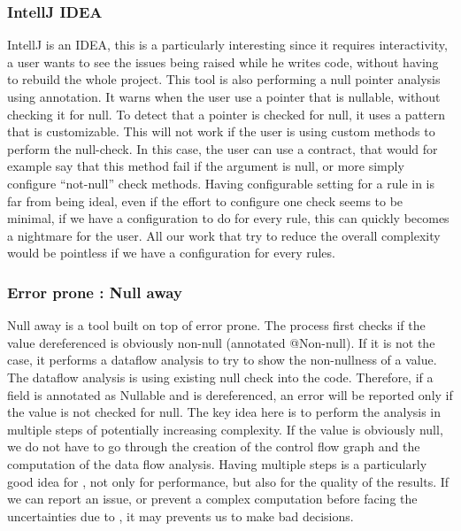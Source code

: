 \subsubsection{IntellJ IDEA}
\label{subsubsec:intellj_idea}

IntellJ is an IDEA, this is a particularly interesting since it requires interactivity, a user wants to see the issues being raised while he writes code, without having to rebuild the whole project. 
This tool is also performing a null pointer analysis using annotation. 
It warns when the user use a pointer that is nullable, without checking it for null. 
To detect that a pointer is checked for null, it uses a pattern that is customizable. 
This will not work if the user is using custom methods to perform the null-check. 
In this case, the user can use a contract, that would for example say that this method fail if the argument is null, or more simply configure “not-null” check methods.\newline
Having configurable setting for a rule in \slang is far from being ideal, even if the effort to configure one check seems to be minimal, if we have a configuration to do for every rule, this can quickly becomes a nightmare for the user. 
All our work that try to reduce the overall complexity would be pointless if we have a configuration for every rules.


\subsubsection{Error prone : Null away}
\label{subsubsec:error_prone}

Null away is a tool built on top of error prone. 
The process first checks if the value dereferenced is obviously non-null (annotated @Non-null). If it is not the case, it performs a dataflow analysis to try to show the non-nullness of a value. 
The dataflow analysis is using existing null check into the code. 
Therefore, if a field is annotated as Nullable and is dereferenced, an error will be reported only if the value is not checked for null. 
The key idea here is to perform the analysis in multiple steps of potentially increasing complexity. 
If the value is obviously null, we do not have to go through the creation of the control flow graph and the computation of the data flow analysis. 
Having multiple steps is a particularly good idea for \slang, not only for performance, but also for the quality of the results. 
If we can report an issue, or prevent a complex computation before facing the uncertainties due to \slang, it may prevents us to make bad decisions.

